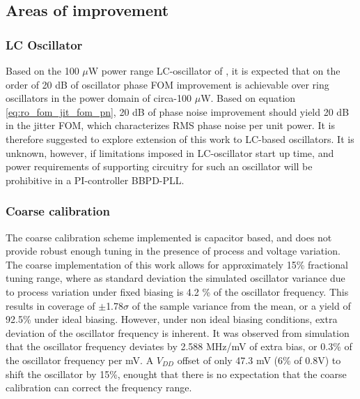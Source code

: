\FloatBarrier


\subsection{Areas of improvement}
	\subsubsection{LC Oscillator}
	Based on the 100 $\mu$W power range LC-oscillator of \cite{Liu2019}, it is expected that on the order of 20 dB of oscillator phase FOM improvement is achievable over ring oscillators in the power domain of circa-100 $\mu$W. Based on equation  \ref{eq:ro_fom_jit_fom_pn}, 20 dB of phase noise improvement should yield 20 dB in the jitter FOM, which characterizes RMS phase noise per unit power. It is therefore suggested to explore extension of this work to LC-based oscillators. It is unknown, however, if limitations imposed in LC-oscillator start up time, and power requirements of supporting circuitry for such an oscillator will be prohibitive in a PI-controller BBPD-PLL.

	\subsubsection{Coarse calibration}
	The coarse calibration scheme implemented is capacitor based, and does not provide robust enough tuning in the presence of process and voltage variation. The coarse implementation of this work allows for approximately 15\% fractional tuning range, where as standard deviation the simulated oscillator variance due to process variation under fixed biasing is 4.2 \% of the oscillator frequency. This results in coverage of $\pm$1.78$\sigma$ of the sample variance from the mean, or a yield of 92.5\% under ideal biasing. However, under non ideal biasing conditions, extra deviation of the oscillator frequency is inherent. It was observed from simulation that the oscillator frequency deviates by 2.588 MHz/mV of extra bias, or 0.3\% of the oscillator frequency per mV. A $V_{DD}$ offset of only 47.3 mV (6\% of 0.8V) to shift the oscillator by 15\%, enought that there is no expectation that the coarse calibration can correct the frequency range. 

